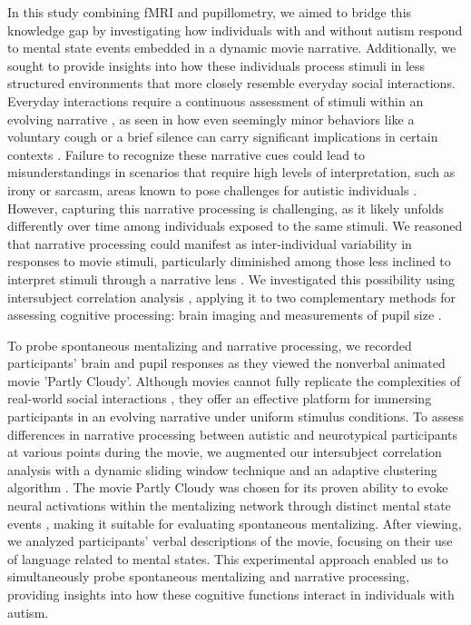 In this study combining fMRI and pupillometry, we aimed to bridge this knowledge gap by investigating how individuals with and without autism respond to mental state events embedded in a dynamic movie narrative. Additionally, we sought to provide insights into how these individuals process stimuli in less structured environments that more closely resemble everyday social interactions. Everyday interactions require a continuous assessment of stimuli within an evolving narrative \citep{goffman1974,johnson2023,stolk2022}, as seen in how even seemingly minor behaviors like a voluntary cough or a brief silence can carry significant implications in certain contexts \citep{kendon1994}. Failure to recognize these narrative cues could lead to misunderstandings in scenarios that require high levels of interpretation, such as irony or sarcasm, areas known to pose challenges for autistic individuals \citep{deliens2018,zalla2014}. However, capturing this narrative processing is challenging, as it likely unfolds differently over time among individuals exposed to the same stimuli. We reasoned that narrative processing could manifest as inter-individual variability in responses to movie stimuli, particularly diminished among those less inclined to interpret stimuli through a narrative lens \citep{chang2021,finn2018,owen2023,zhang2022}. We investigated this possibility using intersubject correlation analysis \citep{hasson2004}, applying it to two complementary methods for assessing cognitive processing: brain imaging and measurements of pupil size \citep{beatty1982}. 

To probe spontaneous mentalizing and narrative processing, we recorded participants' brain and pupil responses as they viewed the nonverbal animated movie 'Partly Cloudy'\citep{jacoby2016,paunov2019}. Although movies cannot fully replicate the complexities of real-world social interactions \citep{wheatley2019}, they offer an effective platform for immersing participants in an evolving narrative under uniform stimulus conditions. To assess differences in narrative processing between autistic and neurotypical participants at various points during the movie, we augmented our intersubject correlation analysis with a dynamic sliding window technique and an adaptive clustering algorithm \citep{maris2007}. The movie Partly Cloudy was chosen for its proven ability to evoke neural activations within the mentalizing network through distinct mental state events \citep{jacoby2016,richardson2018}, making it suitable for evaluating spontaneous mentalizing. After viewing, we analyzed participants' verbal descriptions of the movie, focusing on their use of language related to mental states. This experimental approach enabled us to simultaneously probe spontaneous mentalizing and narrative processing, providing insights into how these cognitive functions interact in individuals with autism.

